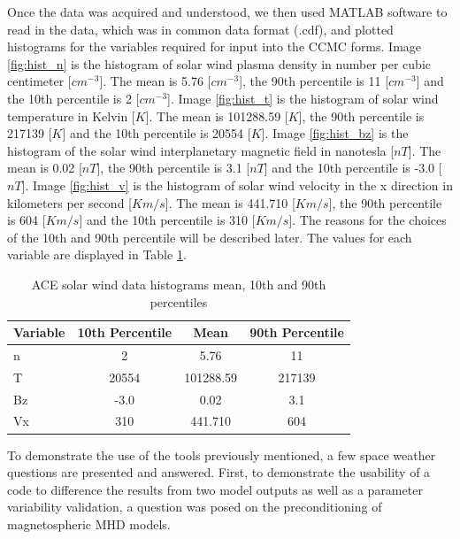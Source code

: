 Once the data was acquired and understood, we then used MATLAB software to read
in the data, which was in common data format (.cdf), and plotted histograms for
the variables required for input into the CCMC forms. Image \ref{fig:hist_n} is
the histogram of solar wind plasma density in number per cubic centimeter
[$cm^{-3}$]. The mean is 5.76 [$cm^{-3}$], the 90th percentile is 11 [$cm^{-3}$]
and the 10th percentile is 2 [$cm^{-3}$]. Image \ref{fig:hist_t} is the
histogram of solar wind temperature in Kelvin [$K$]. The mean is 101288.59
[$K$], the 90th percentile is 217139 [$K$] and the 10th percentile is 20554
[$K$].
Image \ref{fig:hist_bz} is the histogram of the solar wind interplanetary magnetic
field in nanotesla [$nT$]. The mean is 0.02 [$nT$], the 90th percentile is 3.1
[$nT$] and the 10th percentile is -3.0 [$nT$]. Image \ref{fig:hist_v} is the
histogram of solar wind velocity in the x direction in kilometers per second
[$Km/s$]. The mean is 441.710 [$Km/s$], the 90th percentile is 604 [$Km/s$] and
the 10th percentile is 310 [$Km/s$]. The reasons for the choices of the 10th and
90th percentile will be described later. The values for each variable are
displayed in Table \ref{table:histtable}.

\begin{table}
\begin{center}
  \caption{ACE solar wind data histograms mean, 10th and 90th percentiles}
  \begin{tabular}{| l | c | c | c | }
    \hline
    \textbf{Variable} & \textbf{10th Percentile} & \textbf{Mean} &
    \textbf{90th Percentile} \\
    \hline n & 2 & 5.76  & 11   \\ \hline
    T & 20554 & 101288.59  & 217139 \\ \hline
    Bz & -3.0 & 0.02 & 3.1 \\ \hline
    Vx & 310 & 441.710 & 604 \\ \hline
  \end{tabular}
  \label{table:histtable}
\end{center}
\end{table}

To demonstrate the use of the tools previously mentioned, a few space weather
questions are presented and answered. First, to demonstrate the usability of a
code to difference the results from two model outputs as well as a parameter
variability validation, a question was posed on the preconditioning of
magnetospheric MHD models.
